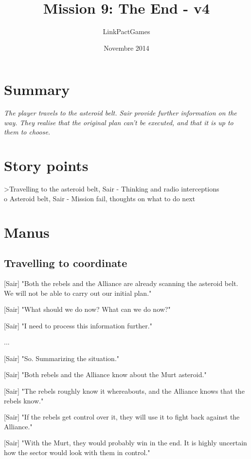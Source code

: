\documentclass[a4paper,12pt]{article}
\begin{document}
\title{Mission 9: The End - v4}
\author{LinkPactGames}
\date{Novembre 2014}
\maketitle

\section{Summary}

\textit{The player travels to the asteroid belt. Sair provide further information on the way.
They realise that the original plan can't be executed, and that it is up to them to choose.}

\section{Story points}

\textgreater Travelling to the asteroid belt, Sair - Thinking and radio interceptions\\
o Asteroid belt, Sair - Mission fail, thoughts on what to do next

\section{Manus}

\subsection{Travelling to coordinate}

[Sair] "Both the rebels and the Alliance are already scanning the asteroid belt. We will not be
able to carry out our initial plan."

[Sair] "What should we do now? What can we do now?" 

[Sair] "I need to process this information further."

...

[Sair] "So. Summarizing the situation."

[Sair] "Both rebels and the Alliance know about the Murt asteroid."

[Sair] "The rebels roughly know it whereabouts, and the Alliance knows that the rebels know."

[Sair] "If the rebels get control over it, they will use it to fight back against the Alliance."

[Sair] "With the Murt, they would probably win in the end. It is highly uncertain how the sector would look with them in control."
\end{document}
